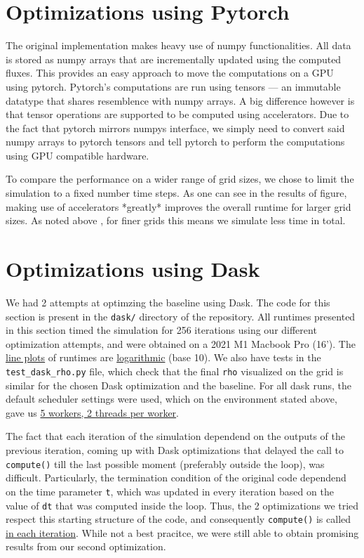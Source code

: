\documentclass[a4paper,10pt]{article}
\begin{document}
\section{Optimizations using Pytorch}
The original implementation makes heavy use of numpy functionalities.
All data is stored as numpy arrays that are incrementally updated using the computed fluxes.
This provides an easy approach to move the computations on a GPU using pytorch.
Pytorch's computations are run using tensors --- an immutable datatype that shares resemblence with numpy arrays.
A big difference however is that tensor operations are supported to be computed using accelerators.
Due to the fact that pytorch mirrors numpys interface, we simply need to convert said numpy arrays to pytorch tensors
and tell pytorch to perform the computations using GPU compatible hardware.

To compare the performance on a wider range of grid sizes, we chose to limit the simulation to a fixed number time steps.
As one can see in the results of figure, making use of accelerators *greatly* improves the overall runtime for larger grid sizes.
As noted above , for finer grids this means we simulate less time in total.

\section{Optimizations using Dask}
We had 2 attempts at optimzing the baseline using Dask.
The code for this section is present in the \verb|dask/| directory of the repository.
All runtimes presented in this section timed the simulation for 256 iterations using our different optimization attempts, and were obtained on a 2021 M1 Macbook Pro (16').
The \underline{line plots} of runtimes are \underline{logarithmic} (base 10).
We also have tests in the \verb|test_dask_rho.py| file, which check that the final \verb|rho| visualized on the grid is similar for the chosen Dask optimization and the baseline.
For all dask runs, the default scheduler settings were used, which on the environment stated above, gave us \underline{5 workers, 2 threads per worker}.

The fact that each iteration of the simulation dependend on the outputs of the previous iteration, coming up with Dask optimizations that delayed the call to \verb|compute()| till the last possible moment (preferably outside the loop), was difficult.
Particularly, the termination condition of the original code dependend on the time parameter \verb|t|, which was updated in every iteration based on the value of \verb|dt| that was computed inside the loop.
Thus, the 2 optimizations we tried respect this starting structure of the code, and consequently \verb|compute()| is called \underline{in each iteration}.
While not a best pracitce, we were still able to obtain promising results from our second optimization.
\end{document}
